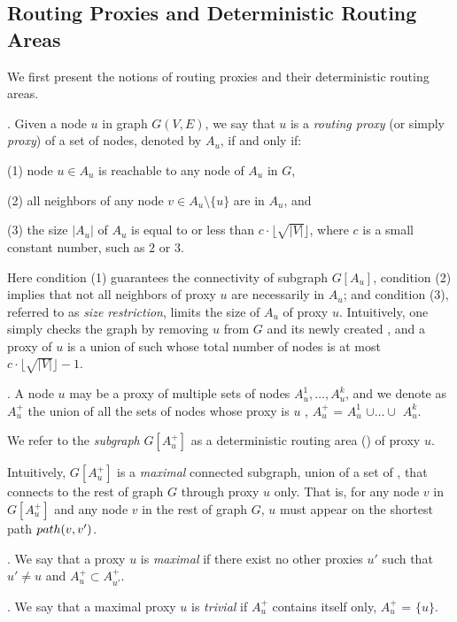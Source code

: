 \subsection{Routing Proxies and Deterministic Routing Areas}
\label{subsec-proxy-def}

We first present the notions of routing proxies and their deterministic routing areas.

. Given a node $u$ in graph $G(V, E)$, we say that $u$ is a {\em routing proxy} (or simply {\em proxy}) of a set of nodes, denoted by $A_{u}$, if and only if:

\sstab(1) node $u\in A_{u}$ is reachable to any node of $A_u$ in $G$,

\sstab(2) all neighbors of any node $v\in A_u\setminus \{u\}$ are in $A_u$,  and

\sstab(3) the size $|A_u|$ of $A_u$ is equal to or less than $c\cdot\lfloor\sqrt{|V|}\rfloor$, where $c$ is a small constant number, such as $2$ or $3$.


Here condition (1) guarantees the connectivity of subgraph $G[A_u]$,  condition (2) implies that not all neighbors of proxy $u$ are necessarily in $A_u$;
and condition (3), referred to as {\em size restriction}, limits the size of $A_u$ of proxy $u$.
Intuitively, one simply checks the graph by removing $u$ from $G$ and its newly created
\ccs , and a proxy of $u$ is a union of such \ccs whose total number of nodes is at most $c\cdot\lfloor\sqrt{|V|}\rfloor - 1$.




. A node $u$ may be a proxy of multiple sets of nodes $A^1_u, \ldots, A^k_u$, and
we denote as $A^{+}_u$ the union of all the sets of nodes whose proxy is $u$ , \ie  $A^{+}_u$ = $A^1_u$ $\cup\ldots\cup$ $A^k_u$.

We refer to the {\em subgraph} $G[A^+_u]$ as a deterministic routing area (\dra) of proxy $u$.

Intuitively, \dra $G[A^+_u]$ is a {\em maximal} connected subgraph, union of a set of \ccs, that connects to the rest of graph $G$ through proxy $u$ only.
That is, for any node $v$ in $G[A^+_u]$ and any node $v$ in the rest of graph $G$, $u$ must appear on the shortest path $\path(v, v')$.

.  We say that a proxy $u$ is {\em maximal} if there exist no other proxies $u'$ such that $u'\ne u$ and $A^+_{u} \subset A^+_{u'}$.

. We say that a maximal proxy $u$ is {\em trivial} if $A^+_u$ contains itself only, \ie $A^+_{u}$ = $\{u\}$.


